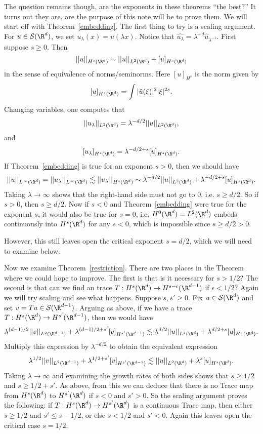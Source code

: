 \documentclass[12pt]{article}
\begin{document}
The question remains though, are the exponents in these theorems ``the best?'' It turns out they are, are the purpose of this note will be to prove them. We will start off with Theorem~\ref{embedding}. The first thing to try is a scaling argument. For $u \in \mathcal S(\R^d)$, we set $u_\lambda(x) = u(\lambda x)$. Notice that $\widehat{u_\lambda} = \lambda^{-d}\hat{u}_{\lambda^{-1}}$. First suppose $s \geq 0$. Then
\[||u||_{H^s(\R^d)} \sim ||u||_{L^2(\R^d)} + [u]_{H^s(\R^d)}\]
in the sense of equivalence of norms/seminorms. Here $[u]_{H^s}$ is the norm given by
\[[u]_{H^s(\R^d)} = \int |\hat{u}(\xi)|^2|\xi|^{2s}.\]
Changing variables, one computes that
\[||u_\lambda||_{L^2(\R^d)} = \lambda^{-d/2}||u||_{L^2(\R^d)},\]
and
\[[u_\lambda]_{H^s(\R^d)} = \lambda^{-d/2+s}[u]_{H^s(\R^d)}.\]
If Theorem~\ref{embedding} is true for an exponent $s > 0$, then we should have
\[||u||_{L^\infty(\R^d)} = ||u_\lambda||_{L^\infty(\R^d)} \lesssim ||u_\lambda||_{H^s(\R^d)} \sim \lambda^{-d/2}||u||_{L^2(\R^d)} +  \lambda^{-d/2+s}[u]_{H^s(\R^d)}.\]
Taking $\lambda \to \infty$ shows that the right-hand side must not go to $0$, i.e. $s \geq d/2$. So if $s > 0$, then $s \geq d/2$. Now if $s < 0$ and Theorem~\ref{embedding} were true for the exponent $s$, it would also be true for $s = 0$, i.e. $H^0(\R^d) = L^2(\R^d)$ embeds continuously into $H^s(\R^d)$ for any $s < 0$, which is impossible since $s \geq d/2 > 0$.

However, this still leaves open the critical exponent $s = d/2$, which we will need to examine below.

Now we examine Theorem~\ref{restriction}. There are two places in the Theorem where we could hope to improve. The first is that is it necessary for $s > 1/2$? The second is that can we find an trace $T:H^s(\R^d) \to H^{s-\epsilon}(\R^{d-1})$ if $\epsilon < 1/2$? Again we will try scaling and see what happens. Suppose $s,s' \geq 0$. Fix $u \in \mathcal S(\R^{d})$ and set $v = Tu \in \mathcal S(\R^{d-1})$. Arguing as above, if we have a trace $T:H^s(\R^d) \to H^{s'}(\R^{d-1})$, then we would have
\[\lambda^{(d-1)/2}||v||_{L^2(\R^{d-1})} + \lambda^{(d-1)/2+s'}[v]_{H^{s'}(\R^{d-1})} \lesssim \lambda^{d/2}||u||_{L^2(\R^d)} + \lambda^{d/2+s}[u]_{H^s(\R^d)}.\]
Multiply this expression by $\lambda^{-d/2}$ to obtain the equivalent expression
\[\lambda^{1/2}||v||_{L^2(\R^{d-1})} + \lambda^{1/2+s'}[v]_{H^{s'}(\R^{d-1})} \lesssim ||u||_{L^2(\R^d)} + \lambda^{s}[u]_{H^s(\R^d)}.\]
Taking $\lambda \to \infty$ and examining the growth rates of both sides shows that $s \geq 1/2$ and $s \geq 1/2+s'$. As above, from this we can deduce that there is no Trace map from $H^s(\R^d)$ to $H^{s'}(\R^d)$ if $s < 0$ and $s' > 0$. So the scaling argument proves the following: if $T:H^s(\R^d) \to H^{s'}(\R^d)$ is a continuous Trace map, then either $s \geq 1/2$ and $s' \leq s-1/2$, or else $s < 1/2$ and $s' < 0$. Again this leaves open the critical case $s = 1/2$.
\end{document}
